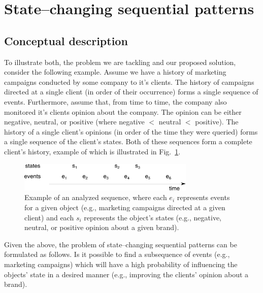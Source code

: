 \documentclass[runningheads,a4paper]{llncs}
\begin{document}
\section{State--changing sequential patterns}
\label{sec:main}

\subsection{Conceptual description}
To illustrate both, the problem we are tackling and our proposed solution, consider the following example.
Assume we have a history of marketing campaigns conducted by some company to it's clients.
The history of campaigns directed at a single client (in order of their occurrence) forms a single sequence of events.
Furthermore, assume that, from time to time, the company also monitored it's clients opinion about the company.
The opinion can be either negative, neutral, or positive (where negative $<$ neutral $<$ positive).
The history of a single client's opinions (in order of the time they were queried) forms a single sequence of the client's states.
Both of these sequences form a complete client's history, example of which is illustrated in Fig.~\ref{fig:example}.

\begin{figure}[!ht]
	\centering
		\includegraphics[width=0.75\textwidth]{images/example}
	\caption{Example of an analyzed sequence, where each $e_i$ represents events for a given object (e.g., marketing campaigns directed at a given client) and each $s_i$ represents the object's states (e.g., negative, neutral, or positive opinion about a given brand).}
	\label{fig:example}
\end{figure}

Given the above, the problem of state--changing sequential patterns can be formulated as follows.
Is it possible to find a subsequence of events (e.g., marketing campaigns) which will have a high probability of influencing the objects' state in a desired manner (e.g., improving the clients' opinion about a brand).
\end{document}
